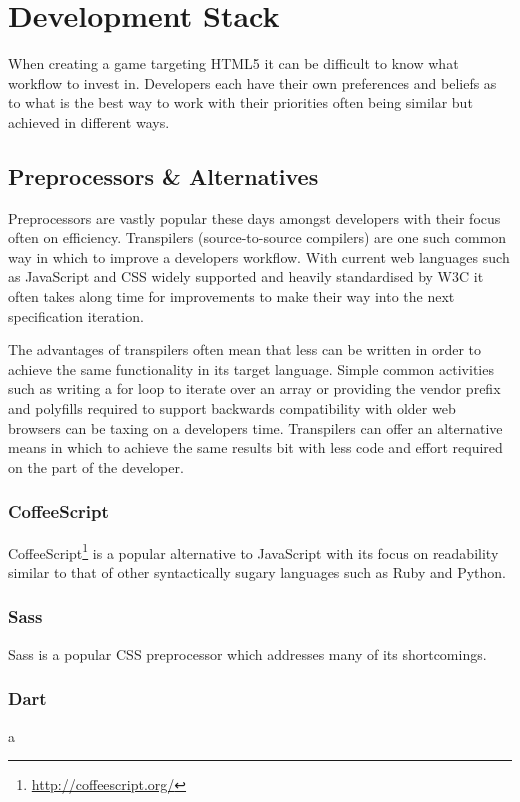 \documentclass[final]{cmpreport}
\begin{document}
\section{Development Stack}
When creating a game targeting HTML5 it can be difficult to know what workflow to invest in. Developers each have their own preferences and beliefs as to what is the best way to work with their priorities often being similar but achieved in different ways.

\subsection{Preprocessors \& Alternatives}
Preprocessors are vastly popular these days amongst developers with their focus often on efficiency. Transpilers (source-to-source compilers) are one such common way in which to improve a developers workflow. With current web languages such as JavaScript and CSS widely supported and heavily standardised by W3C it often takes along time for improvements to make their way into the next specification iteration.

The advantages of transpilers often mean that less can be written in order to achieve the same functionality in its target language. Simple common activities such as writing a for loop to iterate over an array or providing the vendor prefix and polyfills required to support backwards compatibility with older web browsers can be taxing on a developers time. Transpilers can offer an alternative means in which to achieve the same results bit with less code and effort required on the part of the developer.

\subsubsection{CoffeeScript}
CoffeeScript\footnote{\url{http://coffeescript.org/}} is a popular alternative to JavaScript with its focus on readability similar to that of other syntactically sugary \cite[p.~432]{raymond1996new} languages such as Ruby and Python.

\subsubsection{Sass}
Sass is a popular CSS preprocessor which addresses many of its shortcomings.

\subsubsection{Dart}
a
\end{document}
